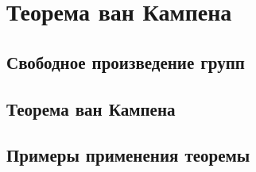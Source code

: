 \section{Теорема ван Кампена}
\subsection{Свободное произведение групп}
\subsection{Теорема ван Кампена}
\subsection{Примеры применения теоремы}
